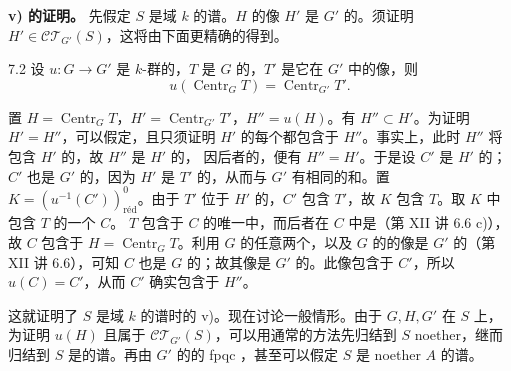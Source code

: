 \textbf{v) 的证明。} 先假定 $S$ 是域 $k$ 的谱。$H$ 的像 $H'$ 是 $G'$ 的。须证明 $H'\in\mathcal{CT}_{G'}(S)$，这将由下面更精确的得到。
\begin{SGAresult}{}{7.2}
设 $u:G\to G'$ 是 $k$-群的，$T$ 是 $G$ 的，$T'$ 是它在 $G'$ 中的像，则
\[u(\operatorname{Centr}_G T)=\operatorname{Centr}_{G'}T'.\]
\end{SGAresult}
置 $H=\operatorname{Centr}_G T$，$H'=\operatorname{Centr}_{G'}T'$，$H''=u(H)$。有 $H''\subset H'$。为证明 $H'=H''$，可以假定，且只须证明 $H'$ 的每个都包含于 $H''$。事实上，此时 $H''$ 将包含 $H'$ 的，故 $H''$ 是 $H'$ 的，
因后者的，便有 $H''=H'$。于是设 $C'$ 是 $H'$ 的；$C'$ 也是 $G'$ 的，因为 $H'$ 是 $T'$ 的，从而与 $G'$ 有相同的和。置 $K=(u^{-1}(C'))^0_{\mathrm{r\text{é}d}}$。由于 $T'$ 位于 $H'$ 的，$C'$ 包含 $T'$，故 $K$ 包含 $T$。取 $K$ 中包含 $T$ 的一个 $C$。 $T$ 包含于 $C$ 的唯一中，而后者在 $C$ 中是（第 XII 讲 6.6 c)），故 $C$ 包含于 $H=\operatorname{Centr}_G T$。利用 $G$ 的任意两个，以及 $G$ 的的像是 $G'$ 的（第 XII 讲 6.6），可知 $C$ 也是 $G$ 的；故其像是 $G'$ 的。此像包含于 $C'$，所以 $u(C)=C'$，从而 $C'$ 确实包含于 $H''$。

这就证明了 $S$ 是域 $k$ 的谱时的 v)。现在讨论一般情形。由于 $G,H,G'$ 在 $S$ 上，为证明 $u(H)$ 且属于 $\mathcal{CT}_{G'}(S)$，可以用通常的方法先归结到 $S$  noether，继而归结到 $S$ 是的谱。再由 $G'$ 的的 fpqc ，甚至可以假定 $S$ 是 noether  $A$ 的谱。

